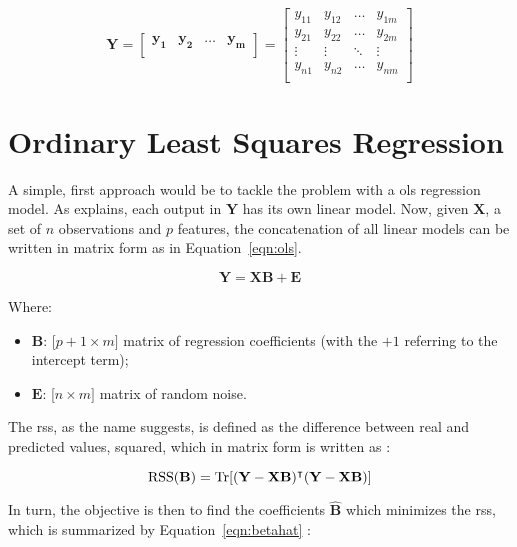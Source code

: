 \begin{equation*}
	\mathbf{Y} = 
	\begin{bmatrix}
		\mathbf{y_1} & \mathbf{y_2} &\dots &\mathbf{y_m}\\
	\end{bmatrix} 
	=
	\begin{bmatrix}
		
		y_{11} & y_{12} & \dots & y_{1m}\\
		y_{21} & y_{22} & \dots & y_{2m}\\
		\vdots  & \vdots & \ddots &\vdots\\
		y_{n1} & y_{n2} & \dots & y_{nm}\\
	\end{bmatrix}
\end{equation*}

\section{Ordinary Least Squares Regression}
\label{sec:linreg}

A simple, first approach would be to tackle the problem with a \acrfull{ols} regression model. As \cite{friedman2001} explains, each output in  $\mathbf{Y}$ has its own linear model. Now, given $\mathbf{X}$, a set of $n$ observations  and $p$ features,  the concatenation of all linear models can be written in matrix form as in Equation~\ref{eqn:ols}.

\begin{equation}
	\label{eqn:ols}
	\mathbf{Y = XB +  E}
\end{equation}

Where:
\begin{itemize}
	\item $\mathbf{B}$: [$p+1 \times m]$ matrix of regression coefficients (with the $+1$ referring to the intercept term);
	\item $\mathbf{E}$: [$n \times m]$ matrix of random noise.
\end{itemize}

The \acrfull{rss}, as the name suggests, is defined as the difference between real and predicted values, squared, which in matrix form is written as \parencite{friedman2001}:

\begin{equation} 
	\label{eqn:rss}
	\text{RSS}(\mathbf{B}) = \operatorname{Tr} [\mathbf{(Y-XB)^\intercal (Y-XB)}]
\end{equation}

In turn, the objective is then to find the coefficients $\mathbf{\hat{B}}$ which minimizes the \acrshort{rss}, which is summarized by Equation~\ref{eqn:betahat} \parencite{friedman2001}:

